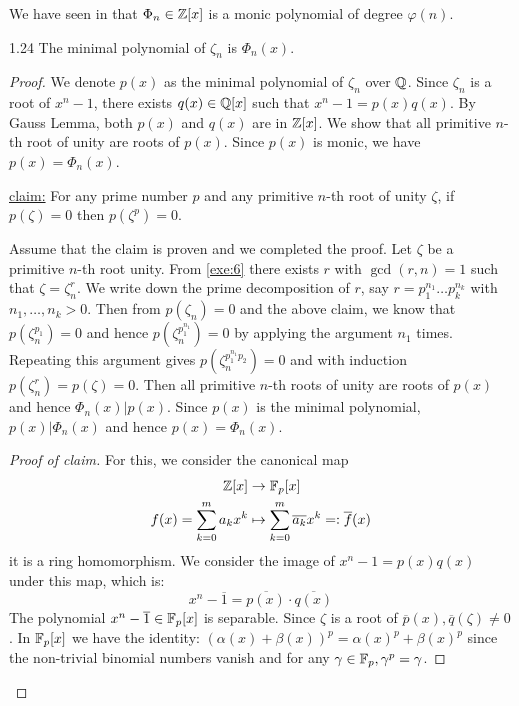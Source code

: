 \documentclass[twoside = false,	%
		headsepline,		%
		parskip = true,
		]{scrbook}						%
\begin{document}
        We have seen in \cite{Cobra} that $\Phi_n \in \mathbb Z[x]$ is a monic polynomial of degree $\varphi(n)$.
        
        \begin{lemma}{}{1.24}
            The minimal polynomial of $\zeta_n$ is $\Phi_n(x)$.
        \end{lemma}
        
        \begin{proof}
            We denote $p(x)$ as the minimal polynomial of $\zeta_n$ over $\mathbb Q$. Since $\zeta_n$ is a root of $x^n - 1$, there exists $q(x) \in \mathbb Q[x]$ such that $x^n - 1 = p(x)q(x)$. By Gauss Lemma, both $p(x)$ and $q(x)$ are in $\mathbb Z[x]$. We show that all primitive $n$-th root of unity are roots of $p(x)$. Since $p(x)$ is monic, we have $p(x) = \Phi_n(x)$.
            
            \underline{claim:}
                For any prime number $p$ and any primitive $n$-th root of unity $\zeta$, if $p(\zeta) = 0$ then $p\left(\zeta^p\right) = 0$.
                
            
            Assume that the claim is proven and we completed the proof. Let $\zeta$ be a primitive $n$-th root unity. From \ref{exe:6} there exists $r$ with $\gcd(r,n) = 1$ such that $\zeta = \zeta_n^r$. We write down the prime decomposition of $r$, say $r = p_1^{n_1} \dots p_k^{n_k}$ with $n_1,\dots,n_k > 0$. Then from $p(\zeta_n) = 0$ and the above claim, we know that $p\left(\zeta_n^{p_1}\right) = 0$ and hence $p\left(\zeta_n^{p_1^{n_1}}\right) = 0$ by applying the argument $n_1$ times. Repeating this argument gives $p\left(\zeta_n^{p_1^{n_1}p_2}\right) = 0$ and with induction $p\left(\zeta_n^r\right) = p(\zeta) = 0$. Then all primitive $n$-th roots of unity are roots of $p(x)$ and hence $\Phi_n(x) | p(x)$. Since $p(x)$ is the minimal polynomial, $p(x) | \Phi_n(x)$ and hence $p(x) = \Phi_n(x)$.
            
            \begin{proof}[Proof of claim]
                For this, we consider the canonical map
                \begin{equation*}
                    \begin{split}
                    \mathbb Z[x] &\rightarrow \mathbb F_p[x] \\        f(x) = \sum_{k=0}^{m} a_k x^k  &\mapsto \sum_{k=0}^m \overline{a_k}x^k =: \overline{f}(x)
                    \end{split} 
                \end{equation*}
                it is a ring homomorphism. We consider the image of $x^n - 1 = p(x)q(x)$ under this map, which is:
                \begin{equation*}
                    x^n - \overline{1} = \overline{p(x)} \cdot \overline{q(x)}
                \end{equation*}
                The polynomial $x^n - \overline{1} \in \mathbb F_p[x]$ is separable. Since $\zeta$ is a root of $\overline{p}(x), \overline{q}(\zeta) \neq 0$.
                In $\mathbb F_p[x]$ we have the identity: $(\alpha(x) + \beta(x))^p = \alpha(x)^p + \beta(x)^p$ since the non-trivial binomial numbers vanish and for any $\gamma \in \mathbb F_p, \gamma^p = \gamma$.
                

\end{proof}
\end{proof}
\end{document}
